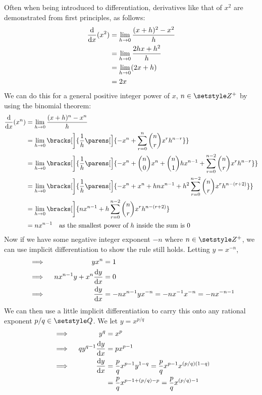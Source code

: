 Often when being introduced to differentiation, derivatives like that of
\(x^2\) are demonstrated from first principles, as follows:
\begin{align*}
 \dv{x}(x^2) &= \lim_{h \to 0} \frac{(x + h)^2 - x^2} h \\
             &= \lim_{h \to 0} \frac{2hx + h^2} h \\
             &= \lim_{h \to 0} (2x + h) \\
             &= 2x
\end{align*}
We can do this for a general positive integer power of \(x\),
\(n \in \Integers^+\) by using the binomial theorem:
\begin{align*}
 \dv{x}(x^n) &= \lim_{h \to 0} \frac{(x + h)^n - x^n} h \\
             &= \lim_{h \to 0} \bracks[\bigg]{\frac 1h \parens[\Big]{-x^n
                     + \sum_{r = 0}^n \binom nr x^r h^{n - r}}} \\
             &= \lim_{h \to 0} \bracks[\bigg]{\frac 1h \parens[\Big]{
                       -x^n + \binom n0 x^n + \binom n1 hx^{n - 1}
                       + \sum_{r = 0}^{n - 2}
               \binom nr x^r h^{n - r}}} \\
             &= \lim_{h \to 0} \bracks[\bigg]{\frac 1h \parens[\Big]{-x^n + x^n
                         + hnx^{n - 1} + h^2 \sum_{r = 0}^{n - 2}
               \binom nr x^r h^{n - (r + 2)}}} \\
             &= \lim_{h \to 0} \bracks[\bigg]{nx^{n - 1} + h \sum_{r = 0}^{n - 2}
               \binom nr x^r h^{n - (r + 2)}} \\
             &= nx^{n-1}\quad
               \text{as the smallest power of \(h\) inside the sum is 0}
\end{align*}
Now if we have some negative integer exponent \(-n\) where
\(n \in \Integers^+\), we can use implicit differentiation to show the rule
still holds. Letting \(y = x^{-n}\),
\begin{alignat*}{2}
 &\implies{}& yx^n &= 1 \\
 &\implies{}& nx^{n - 1}y + x^n \dv<y>{x} &= 0 \\
 &\implies{}& \dv<y>{x} &= -nx^{n - 1}yx^{-n}
     = -nx^{-1}x^{-n} = -nx^{-n - 1}
\end{alignat*}
We can then use a little implicit differentiation to carry this onto any
rational exponent \(p / q \in \Rationals\). We let \(y = x^{p / q}\)
\begin{alignat*}{2}
 &\implies{}& y^q &= x^p \\
 &\implies{}& qy^{q - 1}\dv<y>{x} &= px^{p - 1} \\
 &\implies{}& \dv<y>{x} &= \frac pq x^{p - 1}y^{1 - q}
     = \frac pq x^{p - 1}x^{(p / q)(1 - q)} \\
 &&  &= \frac pq x^{p - 1 + (p / q) - p}
     = \frac pq x^{(p / q) - 1}
\end{alignat*}

